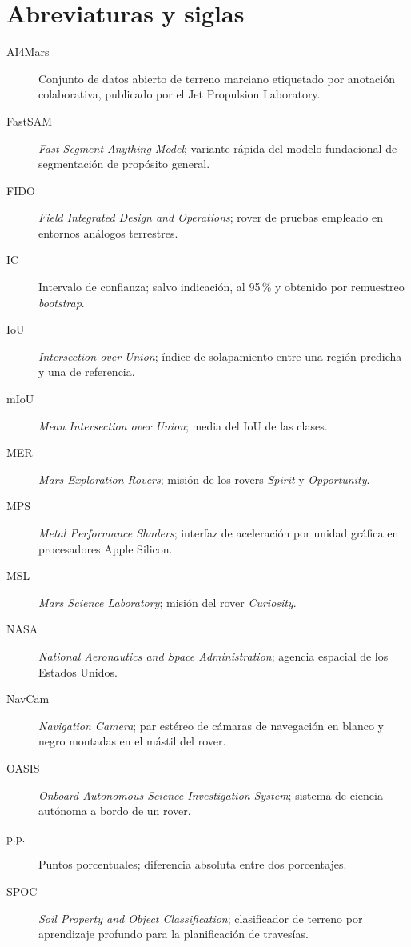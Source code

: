 \chapter*{Abreviaturas y siglas}

\begin{description}
  \item[AI4Mars] Conjunto de datos abierto de terreno marciano etiquetado por
    anotación colaborativa, publicado por el Jet Propulsion Laboratory.
  \item[FastSAM] \textit{Fast Segment Anything Model}; variante rápida del modelo
    fundacional de segmentación de propósito general.
  \item[FIDO] \textit{Field Integrated Design and Operations}; rover de pruebas
    empleado en entornos análogos terrestres.
  \item[IC] Intervalo de confianza; salvo indicación, al 95\,\% y obtenido por
    remuestreo \textit{bootstrap}.
  \item[IoU] \textit{Intersection over Union}; índice de solapamiento entre una
    región predicha y una de referencia.
  \item[mIoU] \textit{Mean Intersection over Union}; media del IoU de las clases.
  \item[MER] \textit{Mars Exploration Rovers}; misión de los rovers
    \textit{Spirit} y \textit{Opportunity}.
  \item[MPS] \textit{Metal Performance Shaders}; interfaz de aceleración por
    unidad gráfica en procesadores Apple Silicon.
  \item[MSL] \textit{Mars Science Laboratory}; misión del rover \textit{Curiosity}.
  \item[NASA] \textit{National Aeronautics and Space Administration}; agencia
    espacial de los Estados Unidos.
  \item[NavCam] \textit{Navigation Camera}; par estéreo de cámaras de navegación
    en blanco y negro montadas en el mástil del rover.
  \item[OASIS] \textit{Onboard Autonomous Science Investigation System}; sistema de
    ciencia autónoma a bordo de un rover.
  \item[p.p.] Puntos porcentuales; diferencia absoluta entre dos porcentajes.
  \item[SPOC] \textit{Soil Property and Object Classification}; clasificador de
    terreno por aprendizaje profundo para la planificación de travesías.
\end{description}
\clearpage
